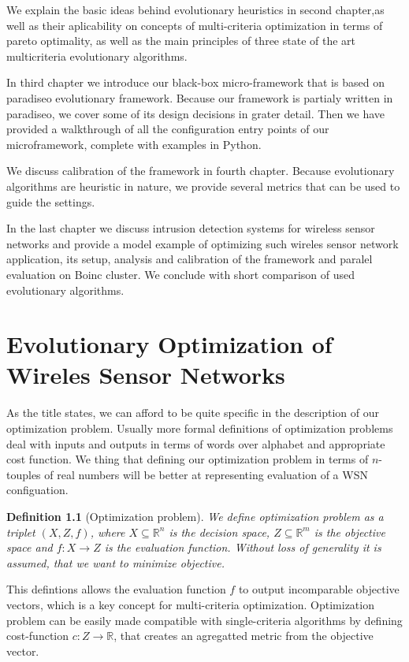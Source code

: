 \documentclass[12pt,oneside]{fithesis2}
\newtheorem{defn}{Definition}
\begin{document}
We explain the basic ideas behind evolutionary heuristics in second chapter,as well as their aplicability on concepts of multi-criteria optimization in terms of pareto optimality, as well as the main principles of three state of the art multicriteria evolutionary algorithms. 

In third chapter we introduce our black-box micro-framework that is based on paradiseo evolutionary framework. Because our framework is partialy written in paradiseo, we cover some of its design decisions in grater detail. Then we have provided a walkthrough of all the configuration entry points of our microframework, complete with examples in Python.

We discuss calibration of the framework in fourth chapter. Because evolutionary algorithms are heuristic in nature, we provide several metrics that can be used to guide the settings. 

In the last chapter we discuss intrusion detection systems for wireless sensor networks and provide a model example of optimizing such wireles sensor network application, its setup, analysis and calibration of the framework and paralel evaluation on Boinc cluster. We conclude with short comparison of used evolutionary algorithms.

\chapter{Evolutionary Optimization of Wireles Sensor Networks}

As the title states, we can afford to be quite specific in the description of our optimization problem. Usually more formal definitions of optimization problems deal with inputs and outputs in terms of words over alphabet and appropriate cost function. We thing that defining our optimization problem in terms of $n$-touples of real numbers will be better at representing evaluation of a WSN configuation. 

\begin{defn}[Optimization problem]
We define optimization problem as a triplet $(X,Z,f)$,
 where $X \subseteq \mathbb{R}^n$ is the decision space,
$Z \subseteq \mathbb{R}^m$ is the objective space and $f:X \to Z$ is the evaluation function.
Without loss of generality it is assumed, that we want to minimize objective.
\end{defn}

This defintions allows the evaluation function $f$ to output incomparable objective vectors, which is a key concept for multi-criteria optimization. Optimization problem can be easily made compatible with single-criteria algorithms by defining cost-function $c:Z \to \mathbb{R}$, that creates an agregatted metric from the objective vector.
\end{document}

